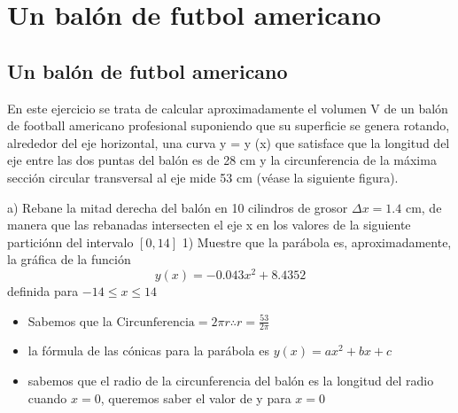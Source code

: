 \chapter*{Un balón de futbol americano}
\section*{Un balón de futbol americano}
En este ejercicio se trata de calcular aproximadamente el volumen V de un balón
de football americano profesional suponiendo que su superficie se genera rotando,
alrededor del eje horizontal, una curva y = y (x) que satisface que la longitud del eje
entre las dos puntas del balón es de 28 cm y la circunferencia de la máxima sección
circular transversal al eje mide 53 cm (véase la siguiente figura).

a) Rebane la mitad derecha del balón en 10 cilindros de grosor $\Delta x = 1.4$ cm, de manera
que las rebanadas intersecten el eje x en los valores de la siguiente particiónn del intervalo
$[0, 14]$ 
1) Muestre que la parábola es, aproximadamente, la gráfica de la función
    $$y(x)=-0.043x^2 + 8.4352$$
definida para $-14\leq x\leq 14$


\begin{itemize}
    \item Sabemos que la $\text{Circunferencia}=2\pi r \therefore r=\frac{53}{2\pi}$
    \item la fórmula de las cónicas para la parábola es $y(x)=ax{^2}+bx+c$
    \item sabemos que el radio de la circunferencia del balón es la longitud del radio cuando $x=0$, queremos saber el valor de y para $x=0$
\end{itemize}

